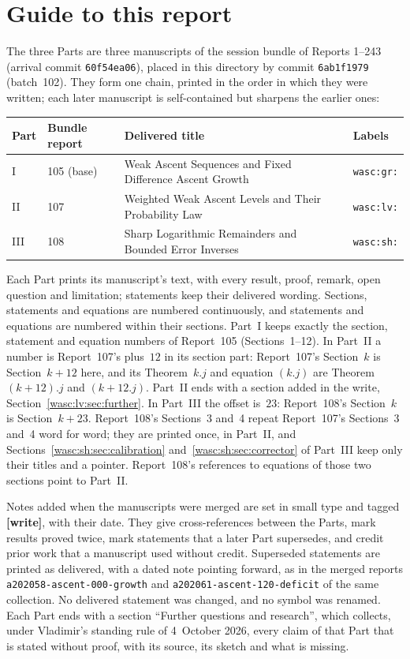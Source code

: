 \documentclass[11pt,a4paper]{article}
\newcommand{\file}[1]{\nolinkurl{#1}}
\theoremstyle{remark}\newtheorem{remark}[theorem]{Remark}
\numberwithin{equation}{section}
\begin{document}
\section*{Guide to this report}\label{wasc:sec:guide}
The three Parts are three manuscripts of the session bundle of Reports 1--243 (arrival commit \texttt{60f54ea06}), placed in this directory by commit \texttt{6ab1f1979} (batch~102). They form one chain, printed in the order in which they were written; each later manuscript is self-contained but sharpens the earlier ones:
\begin{center}
\small
\begin{tabular}{@{}l l >{\raggedright\arraybackslash}p{} l@{}}
\toprule
Part & Bundle report & Delivered title & Labels\\
\midrule
I & 105 (base) & Weak Ascent Sequences and Fixed Difference Ascent Growth & \texttt{wasc:gr:}\\
II & 107 & Weighted Weak Ascent Levels and Their Probability Law & \texttt{wasc:lv:}\\
III & 108 & Sharp Logarithmic Remainders and Bounded Error Inverses & \texttt{wasc:sh:}\\
\bottomrule
\end{tabular}
\end{center}
Each Part prints its manuscript's text, with every result, proof, remark, open question and limitation; statements keep their delivered wording. Sections, statements and equations are numbered continuously, and statements and equations are numbered within their sections. Part~I keeps exactly the section, statement and equation numbers of Report~105 (Sections~1--12). In Part~II a number is Report~107's plus~$12$ in its section part: Report~107's Section~$k$ is Section~$k+12$ here, and its Theorem~$k.j$ and equation $(k.j)$ are Theorem~$(k+12).j$ and $(k+12.j)$. Part~II ends with a section added in the write, Section~\ref{wasc:lv:sec:further}. In Part~III the offset is~$23$: Report~108's Section~$k$ is Section~$k+23$. Report~108's Sections~3 and~4 repeat Report~107's Sections~3 and~4 word for word; they are printed once, in Part~II, and Sections~\ref{wasc:sh:sec:calibration} and~\ref{wasc:sh:sec:corrector} of Part~III keep only their titles and a pointer. Report~108's references to equations of those two sections point to Part~II.

Notes added when the manuscripts were merged are set in small type and tagged \textbf{[write]}, with their date. They give cross-references between the Parts, mark results proved twice, mark statements that a later Part supersedes, and credit prior work that a manuscript used without credit. Superseded statements are printed as delivered, with a dated note pointing forward, as in the merged reports \file{a202058-ascent-000-growth} and \file{a202061-ascent-120-deficit} of the same collection. No delivered statement was changed, and no symbol was renamed. Each Part ends with a section ``Further questions and research'', which collects, under Vladimir's standing rule of 4~October 2026, every claim of that Part that is stated without proof, with its source, its sketch and what is missing.
\end{document}
